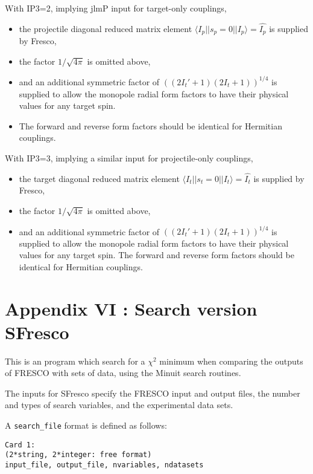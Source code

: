 \documentclass[11pt]{article}
\begin{document}
With IP3=2, implying jlmP input for target-only couplings,
\begin{itemize}
\item
 the projectile diagonal reduced matrix element
$\langle I_p||s_p=0||I_p\rangle = \hat{I_p}$ is supplied by Fresco,
\item
the factor $1/\sqrt{4\pi}$ is omitted above,
\item
and an additional symmetric factor of
$((2I_t'+1)(2I_t+1))^{1/4}$
is supplied to allow the
monopole radial form factors to have their physical
values for any target spin.
\item
The forward and reverse form factors should be identical for Hermitian couplings.

\end{itemize}
With IP3=3, implying a similar input for projectile-only couplings,
\begin{itemize}
\item
 the target diagonal reduced matrix element
 $\langle I_t||s_t=0||I_t\rangle = \hat{I_t}$ is supplied by Fresco,
 \item
 the factor $1/\sqrt{4\pi}$ is omitted above,
 \item
 and an additional symmetric factor of $((2I_t'+1)(2I_t+1))^{1/4}$
 is supplied to allow the monopole radial form factors to have their physical
 values for any target spin.
 The forward and reverse form factors should be identical for Hermitian couplings.
\end{itemize}

%
\newpage
\section*{Appendix VI : Search version {\sc SFresco}}

This is an program which search for a $\chi^2$ minimum when comparing
the outputs of FRESCO with sets of data, using the {\sc Minuit} search
routines.

The inputs for {\sc SFresco} specify the FRESCO input and output files,
the number and types of search variables, and the experimental data sets.

A {\tt search\_file} format is defined as follows:
\begin{verbatim}
Card 1:
(2*string, 2*integer: free format)
input_file, output_file, nvariables, ndatasets
\end{verbatim}
\smallskip
\end{document}
